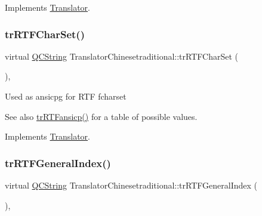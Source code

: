 Implements \mbox{\hyperlink{class_translator_a9953a4c0e6a4fc7d017abcd5c2939e0f}{Translator}}.

\mbox{\label{class_translator_chinesetraditional_a003088d221f11675243a79a94b8ac6a4}} 
\subsubsection{\texorpdfstring{trRTFCharSet()}{trRTFCharSet()}}
{\footnotesize\ttfamily virtual \mbox{\hyperlink{class_q_c_string}{Q\+C\+String}} Translator\+Chinesetraditional\+::tr\+R\+T\+F\+Char\+Set (\begin{DoxyParamCaption}{ }\end{DoxyParamCaption})\hspace{0.3cm}{\ttfamily [inline]}, {\ttfamily [virtual]}}

Used as ansicpg for R\+TF fcharset \begin{DoxySeeAlso}{See also}
\mbox{\hyperlink{class_translator_chinesetraditional_a823b4850251a1459b460f2a68f98f034}{tr\+R\+T\+Fansicp()}} for a table of possible values. 
\end{DoxySeeAlso}


Implements \mbox{\hyperlink{class_translator_afad391f3cbfb5ce6332b7239f8e2049a}{Translator}}.

\mbox{\label{class_translator_chinesetraditional_ae7a8ad1b94cdbc2e09b3683197582917}} 
\subsubsection{\texorpdfstring{trRTFGeneralIndex()}{trRTFGeneralIndex()}}
{\footnotesize\ttfamily virtual \mbox{\hyperlink{class_q_c_string}{Q\+C\+String}} Translator\+Chinesetraditional\+::tr\+R\+T\+F\+General\+Index (\begin{DoxyParamCaption}{ }\end{DoxyParamCaption})\hspace{0.3cm}{\ttfamily [inline]}, {\ttfamily [virtual]}}

